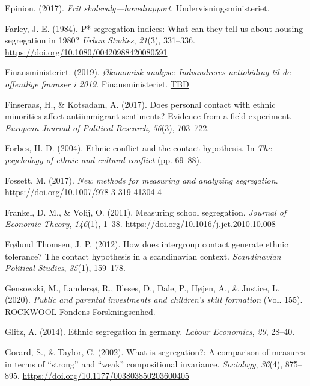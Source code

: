 \documentclass[
]{book}
\newlength{\cslhangindent}
\newenvironment{CSLReferences}[2] %
 {\begin{list}{}{%
  \setlength{\itemindent}{0pt}
  \setlength{\leftmargin}{0pt}
  \setlength{\parsep}{0pt}
  \ifodd #1
   \setlength{\leftmargin}{\cslhangindent}
   \setlength{\itemindent}{-1\cslhangindent}
  \fi
  \setlength{\itemsep}{#2\baselineskip}}}
 {\end{list}}
\begin{document}
\begin{CSLReferences}{1}{0}
Epinion. (2017). \emph{Frit skolevalg---hovedrapport}. Undervisningsministeriet.

Farley, J. E. (1984). P* segregation indices: What can they tell us about housing segregation in 1980? \emph{Urban Studies}, \emph{21}(3), 331--336. \url{https://doi.org/10.1080/00420988420080591}

Finansministeriet. (2019). \emph{Økonomisk analyse: Indvandreres nettobidrag til de offentlige finanser i 2019}. Finansministeriet. \href{https://TBD}{TBD}

Finseraas, H., \& Kotsadam, A. (2017). Does personal contact with ethnic minorities affect antiimmigrant sentiments? Evidence from a field experiment. \emph{European Journal of Political Research}, \emph{56}(3), 703--722.

Forbes, H. D. (2004). Ethnic conflict and the contact hypothesis. In \emph{The psychology of ethnic and cultural conflict} (pp. 69--88).

Fossett, M. (2017). \emph{New methods for measuring and analyzing segregation}. \url{https://doi.org/10.1007/978-3-319-41304-4}

Frankel, D. M., \& Volij, O. (2011). Measuring school segregation. \emph{Journal of Economic Theory}, \emph{146}(1), 1--38. \url{https://doi.org/10.1016/j.jet.2010.10.008}

Frølund Thomsen, J. P. (2012). How does intergroup contact generate ethnic tolerance? The contact hypothesis in a scandinavian context. \emph{Scandinavian Political Studies}, \emph{35}(1), 159--178.

Gensowski, M., Landersø, R., Bleses, D., Dale, P., Højen, A., \& Justice, L. (2020). \emph{Public and parental investments and children's skill formation} (Vol. 155). ROCKWOOL Fondens Forskningsenhed.

Glitz, A. (2014). Ethnic segregation in germany. \emph{Labour Economics}, \emph{29}, 28--40.

Gorard, S., \& Taylor, C. (2002). What is segregation?: A comparison of measures in terms of {``strong''} and {``weak''} compositional invariance. \emph{Sociology}, \emph{36}(4), 875--895. \url{https://doi.org/10.1177/003803850203600405}


\end{CSLReferences}
\end{document}
